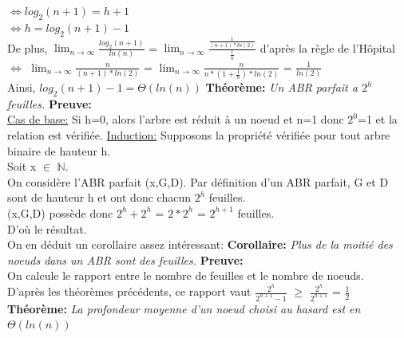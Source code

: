 \documentclass{report}
\begin{document}
$\Leftrightarrow log_2(n+1)=h+1$ \\
$\Leftrightarrow h = log_2(n+1)-1$ \\
De plus, $\lim_{n\to\infty} \frac{log_2(n+1)}{ln(n)}$ = $\lim_{n\to\infty}  \frac{\frac{1}{(n+1)*ln(2)}}{\frac{1}{n}}$ d'après la règle de l'Hôpital \\
$\Leftrightarrow$ $\lim_{n\to\infty} \frac{n}{(n+1)*ln(2)}$ = $\lim_{n\to\infty} \frac{n}{n*(1+\frac{1}{n})*ln(2)}$ = $\frac{1}{ln(2)}$ \\
Ainsi, $log_2(n+1) -1 = \Theta(ln(n))$ \newline \newline \newline
\textbf{Théorème:}  \textit{Un ABR parfait a $2^h$ feuilles.} \newline \newline	
\textbf{Preuve:} \\
\underline{Cas de base:} Si h=0, alors l'arbre est réduit à un noeud et n=1 donc $2^0$=1 et la relation est vérifiée. \newline \newline
\underline{Induction:} Supposons la propriété vérifiée pour tout arbre binaire de hauteur h. \\
Soit x $\in$ $\mathbb{N}$. \\
On considère l'ABR parfait (x,G,D). Par définition d'un ABR parfait, G et D sont de hauteur h et ont donc chacun $2^h$ feuilles. \\
(x,G,D) possède donc  $2^h + 2^h$ = $2*2^h$ =  $2^{h+1}$ feuilles. \\
D'où le résultat. \\ 
On en déduit un corollaire assez intéressant: \newline \newline
\textbf{Corollaire:}  \textit{Plus de la moitié des noeuds dans un ABR sont des feuilles.} \newline \newline
\textbf{Preuve:} \\
On calcule le rapport entre le nombre de feuilles et le nombre de noeuds. \\
D'après les théorèmes précédents, ce rapport vaut $\frac{2^h}{2^{h+1} -1 }$ $\ge$ $\frac{2^h}{2^{h+1}}$ = $\frac{1}{2}$ \newline \newline
\textbf{Théorème:}  \textit{La profondeur moyenne d'un noeud choisi au hasard est en $\Theta(ln(n))$} \newline \newline
\end{document}
